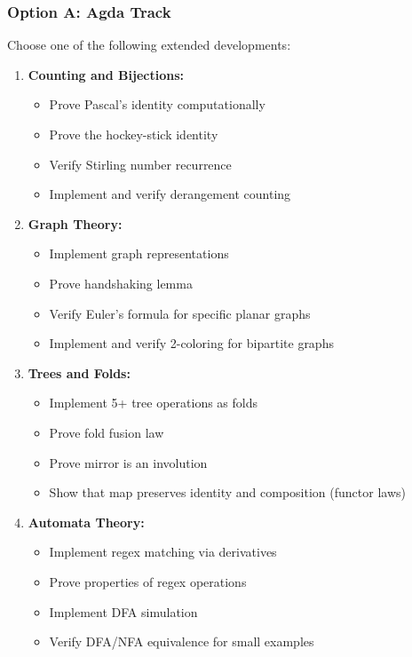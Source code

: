 \documentclass[11pt]{article}
\begin{document}
\subsubsection{Option A: Agda Track}
Choose one of the following extended developments:
\begin{enumerate}
    \item \textbf{Counting and Bijections:}
    \begin{itemize}
        \item Prove Pascal's identity computationally
        \item Prove the hockey-stick identity
        \item Verify Stirling number recurrence
        \item Implement and verify derangement counting
    \end{itemize}

    \item \textbf{Graph Theory:}
    \begin{itemize}
        \item Implement graph representations
        \item Prove handshaking lemma
        \item Verify Euler's formula for specific planar graphs
        \item Implement and verify 2-coloring for bipartite graphs
    \end{itemize}

    \item \textbf{Trees and Folds:}
    \begin{itemize}
        \item Implement 5+ tree operations as folds
        \item Prove fold fusion law
        \item Prove mirror is an involution
        \item Show that map preserves identity and composition (functor laws)
    \end{itemize}

    \item \textbf{Automata Theory:}
    \begin{itemize}
        \item Implement regex matching via derivatives
        \item Prove properties of regex operations
        \item Implement DFA simulation
        \item Verify DFA/NFA equivalence for small examples
    \end{itemize}
\end{enumerate}
\end{document}
